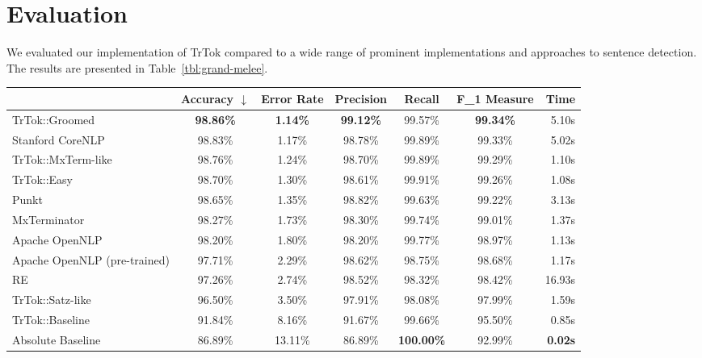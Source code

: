 \section{Evaluation}
\label{sec:eval}

We evaluated our implementation of TrTok compared to a wide range of
prominent implementations and approaches to sentence detection. The
results are presented in Table~\ref{tbl:grand-melee}.

\begin{table*}
  \small
  \begin{center}
    \begin{tabular}{ | l | c | c | c | c | c | r | }
      \hline
      & Accuracy $\downarrow$ & Error Rate & Precision
      & Recall & F_1 Measure & Time \\ \hline
      TrTok::Groomed & \textbf{98.86\%} & \textbf{1.14\%} & \textbf{99.12\%}
                     & 99.57\% & \textbf{99.34\%} & 5.10s \\ \hline
      Stanford CoreNLP & 98.83\% & 1.17\% & 98.78\%
                       & 99.89\% & 99.33\% & 5.02s \\ \hline
      TrTok::MxTerm-like & 98.76\% & 1.24\% & 98.70\%
                         & 99.89\% & 99.29\% & 1.10s \\ \hline
      TrTok::Easy & 98.70\% & 1.30\% & 98.61\%
                  & 99.91\% & 99.26\% & 1.08s \\ \hline
      Punkt & 98.65\% & 1.35\% & 98.82\%
            & 99.63\% & 99.22\% & 3.13s \\ \hline
      MxTerminator & 98.27\% & 1.73\% & 98.30\%
                   & 99.74\% & 99.01\% & 1.37s \\ \hline
      Apache OpenNLP & 98.20\% & 1.80\% & 98.20\%
                     & 99.77\% & 98.97\% & 1.13s \\ \hline
      Apache OpenNLP (pre-trained) & 97.71\% & 2.29\% & 98.62\%
                                   & 98.75\% & 98.68\% & 1.17s \\ \hline
      RE & 97.26\% & 2.74\% & 98.52\%
         & 98.32\% & 98.42\% & 16.93s \\ \hline
      TrTok::Satz-like & 96.50\% & 3.50\% & 97.91\%
                       & 98.08\% & 97.99\% & 1.59s \\ \hline
      TrTok::Baseline & 91.84\% & 8.16\% & 91.67\%
                      & 99.66\% & 95.50\% & 0.85s \\ \hline
      Absolute Baseline & 86.89\% & 13.11\% & 86.89\%
                        & \textbf{100.00\%} & 92.99\% & \textbf{0.02s} \\ \hline
    \end{tabular}
  \end{center}
  \caption[Performance of sentence detectors on the Brown corpus] {The
    performance of the various sentence detectors on full stops from
    the Brown corpus testing data. \\ The 1.15 MB of testing data
    consisted of 11376 sentences and 232893 tokens.}
  \label{tbl:grand-melee}
\end{table*}

